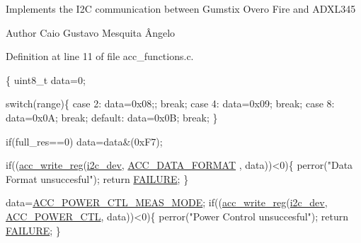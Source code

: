 Implements the I2\-C communication between Gumstix Overo Fire and A\-D\-X\-L345 \begin{DoxyAuthor}{Author}
Caio Gustavo Mesquita Ângelo 
\end{DoxyAuthor}


Definition at line 11 of file acc\-\_\-functions.\-c.


\begin{DoxyCode}
\{ 
  uint8\_t data=0;

  \textcolor{keywordflow}{switch}(range)\{
    \textcolor{keywordflow}{case} 2:
      data=0x08;;
      \textcolor{keywordflow}{break};
    \textcolor{keywordflow}{case} 4:
      data=0x09;
      \textcolor{keywordflow}{break};
    \textcolor{keywordflow}{case} 8:
      data=0x0A;
      \textcolor{keywordflow}{break};
    \textcolor{keywordflow}{default}:
      data=0x0B;
      \textcolor{keywordflow}{break};
  \}
  
  \textcolor{keywordflow}{if}(full\_res==0)
    data=data&(0xF7);
  
  \textcolor{keywordflow}{if}((\hyperlink{group__acc_ga534116416343122de29a5b6ade6876bd}{acc\_write\_reg}(\hyperlink{CommunicationV0_2communication_8c_a7751bd45ac1064efb35adf1f19c25db8}{i2c\_dev}, \hyperlink{communication_2imu__regs_8h_ab4eb7fc69b2a37ee750d3400fc2c53a1}{ACC\_DATA\_FORMAT}
      , data))<0)\{
    perror(\textcolor{stringliteral}{"Data Format unsuccesful"});
    \textcolor{keywordflow}{return} \hyperlink{calibration_2calibration_8h_a6d58f9ac447476b4e084d7ca383f5183}{FAILURE};
  \}
  
  data=\hyperlink{communication_2imu__regs_8h_a9a841ba3e094b01ea439584e12b25894}{ACC\_POWER\_CTL\_MEAS\_MODE};
  \textcolor{keywordflow}{if}((\hyperlink{group__acc_ga534116416343122de29a5b6ade6876bd}{acc\_write\_reg}(\hyperlink{CommunicationV0_2communication_8c_a7751bd45ac1064efb35adf1f19c25db8}{i2c\_dev}, \hyperlink{communication_2imu__regs_8h_ad857d62b61f349216faeda06eff5f9c6}{ACC\_POWER\_CTL}, 
      data))<0)\{
    perror(\textcolor{stringliteral}{"Power Control unsuccesful"});
    \textcolor{keywordflow}{return} \hyperlink{calibration_2calibration_8h_a6d58f9ac447476b4e084d7ca383f5183}{FAILURE};
  \}
  

\end{DoxyCode}
